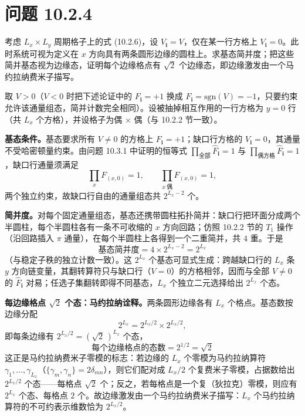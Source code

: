 \section*{问题 10.2.4}
\begin{problem}
考虑 $L_x\times L_y$ 周期格子上的式 (10.2.6)，设 $V_{\pmb i}=V$，仅在某一行方格上 $V_{\pmb i}=0$。此时系统可视为定义在 $x$ 方向具有两条圆形边缘的圆柱上。求基态简并度；把这些简并基态视为边缘态，证明每个边缘格点有 $\sqrt{2}$ 个边缘态，即边缘激发由一个马约拉纳费米子描写。
\end{problem}
\solution
取 $V>0$（$V<0$ 时把下述论证中的 $F_{\pmb i}=+1$ 换成 $F_{\pmb i}=\mathrm{sgn}(V)=-1$，只要约束允许该通量组态，简并计数完全相同）。设被抽掉相互作用的一行方格为 $y=0$ 行（共 $L_x$ 个方格），并设格子为偶 $\times$ 偶（与 10.2.2 节一致）。

\textbf{基态条件。}基态要求所有 $V\neq0$ 的方格上 $F_{\pmb i}=+1$；缺口行方格的 $V_{\pmb i}=0$，其通量不受哈密顿量约束。由问题 10.3.1 中证明的恒等式 $\prod_{\text{全部}}\hat F_{\pmb i}=1$ 与 $\prod_{\text{偶方格}}\hat F_{\pmb i}=1$，缺口行通量须满足
\begin{equation*}
\prod_{x}F_{(x,0)}=1,\qquad \prod_{x\ \text{偶}}F_{(x,0)}=1 ,
\end{equation*}
两个独立约束，故缺口行自由的通量组态共 $2^{L_x-2}$ 个。

\textbf{简并度。}对每个固定通量组态，基态还携带圆柱拓扑简并：缺口行把环面分成两个半圆柱，每个半圆柱各有一条不可收缩的 $x$ 方向回路；仿照 10.2.2 节的 $T_1$ 操作（沿回路插入 $\pi$ 通量），在每个半圆柱上各得到一个二重简并，共 $4$ 重。于是
\begin{equation*}
\boxed{\;\text{基态简并度}=4\times2^{L_x-2}=2^{L_x}\;}
\end{equation*}
（与稳定子秩的独立计数一致）。这 $2^{L_x}$ 个基态可显式生成：跨越缺口行的 $L_x$ 条 $y$ 方向链变量，其翻转算符只与缺口行（$V=0$）的方格相邻，因而与全部 $V\neq0$ 的 $\hat F_{\pmb i}$ 对易；任选子集翻转即得不同基态，$L_x$ 个独立二元选择给出 $2^{L_x}$ 个态。

\textbf{每边缘格点 $\sqrt2$ 个态：马约拉纳诠释。}两条圆形边缘各有 $L_x$ 个格点。基态数按边缘分配
\begin{equation*}
2^{L_x}=2^{L_x/2}\times2^{L_x/2},
\end{equation*}
即每条边缘有 $2^{L_x/2}=(\sqrt2\,)^{L_x}$ 个态，
\begin{equation*}
\boxed{\;\text{每个边缘格点的态数}=2^{1/2}=\sqrt2\;}
\end{equation*}
这正是马约拉纳费米子零模的标志：若边缘的 $L_x$ 个零模为马约拉纳算符 $\gamma_1,\dots,\gamma_{L_x}$（$\{\gamma_m,\gamma_n\}=2\delta_{mn}$），则它们配对成 $L_x/2$ 个复费米子零模，占据数给出 $2^{L_x/2}$ 个态——每格点 $\sqrt2$ 个；反之，若每格点是一个复（狄拉克）零模，则应有 $2^{L_x}$ 个态、每格点 $2$ 个。故边缘激发由一个马约拉纳费米子描写：$L_x$ 个马约拉纳算符的不可约表示维数恰为 $2^{L_x/2}$。

